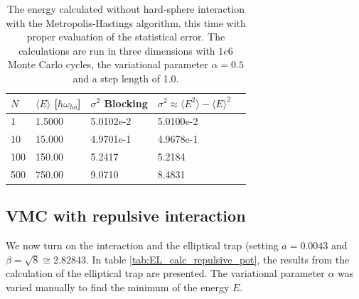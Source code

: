 \documentclass[norsk,a4paper,12pt]{article}
\begin{document}
\begin{table} [H]
	\caption{The energy calculated without hard-sphere interaction with the Metropolis-Hastings algorithm, this time with proper evaluation of the statistical error. The calculations are run in three dimensions with $1e6$ Monte Carlo cycles, the variational parameter $\alpha=0.5$ and a step length of 1.0.\vspace{2mm}}
	\begin{tabularx}{\textwidth}{X|XXXX} \hline\hline
		\label{tab:variance_analysis}
		$N$ & $\langle E\rangle$ [$\hbar\omega_{ho}$] & $\sigma^2$ Blocking & $\sigma^2 \approx \langle E^2 \rangle - \langle E \rangle^2$ \\ \hline
				1 & 1.5000 & 5.0102e-2  & 5.0100e-2 \\
				10 & 15.000 & 4.9701e-1 & 4.9678e-1  \\
				100 & 150.00 & 5.2417 & 5.2184\\
				500 & 750.00 & 9.0710 & 8.4831 \\ \hline
	\end{tabularx}
\end{table}

\subsection{VMC with repulsive interaction}
We now turn on the interaction and the elliptical trap (setting $a=0.0043$ and $\beta=\sqrt{8}\cong2.82843$. In table \ref{tab:EL_calc_repulsive_pot}, the results from the calculation of the elliptical trap are presented. The variational parameter $\alpha$ was varied manually to find the minimum of the energy $E$.
\end{document}
